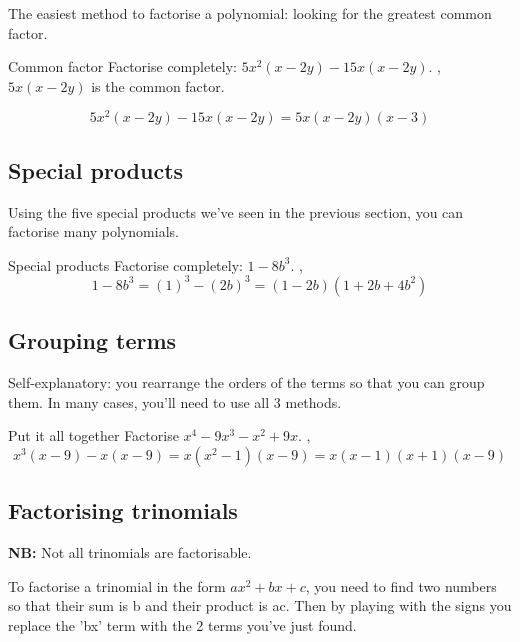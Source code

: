 The easiest method to factorise a polynomial: looking for the greatest common factor.
\begin{example}{Common factor}
Factorise completely: $5x^{2}(x-2y)-15x(x-2y)$.
\sep
$5x(x-2y)$ is the common factor.

\[ 5x^{2}(x-2y)-15x(x-2y)=5x(x-2y)(x-3) \]
\end{example}

\subsection{Special products}

Using the five special products we've seen in the previous section, you can factorise many polynomials.
\begin{example}{Special products}
Factorise completely: $1-8b^{3}$.
\sep
\[ 1-8b^{3}=(1)^{3}-(2b)^{3}=(1-2b)\left(1+2b+4b^{2}\right) \]
\end{example}

\subsection{Grouping terms}

Self-explanatory: you rearrange the orders of the terms so that you can group them. In many cases, you'll need to use all 3 methods.
\begin{example}{Put it all together}
Factorise $x^{4}-9x^{3}-x^{2}+9x$.
\sep
\[ x^{3}(x-9)-x(x-9)=x\left(x^{2}-1\right)(x-9)=x(x-1)(x+1)(x-9) \]
\end{example}

\subsection{Factorising trinomials}

\textbf{NB:} Not all trinomials are factorisable.

To factorise a trinomial in the form $ax^{2}+bx+c$, you need to find two numbers so that their sum is b and their product is ac. Then by playing with the signs you replace the 'bx' term with the 2 terms you've just found. %

